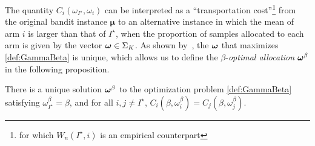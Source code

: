 The quantity $C_i(\omega_{I^\star},\omega_i)$ can be interpreted as a ``transportation cost''\footnote{for which $W_n(I^\star,i)$ is an empirical counterpart} from the original bandit instance $\bm\mu$ to an alternative instance in which the mean of arm $i$ is larger than that of $I^\star$, when the proportion of samples allocated to each arm is given by the vector ${\boldsymbol \omega} \in \Sigma_K$. As shown by~\cite{russo2016ttts}, the ${\boldsymbol \omega}$ that maximizes \eqref{def:GammaBeta} is unique, which allows us to define the $\beta$-\emph{optimal allocation} ${\boldsymbol \omega}^\beta$ in the following proposition.

\begin{proposition}\label{prop:optim}
\begin{leftbar}[propositionbar]
There is a unique solution ${\boldsymbol \omega}^\beta$ to the optimization problem \eqref{def:GammaBeta}
satisfying $\omega_{I^\star}^\beta = \beta$, and for all $i,j \neq I^\star$, $C_i(\beta,\omega_i^\beta) = C_j(\beta,\omega_j^\beta)$.
\end{leftbar}
\end{proposition}

